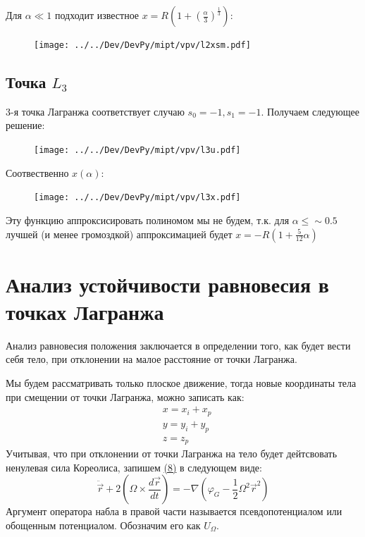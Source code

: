 \documentclass[a4paper]{article} %
\begin{document}
Для $\alpha \ll 1$ подходит известное $x = R\left(1 + (\frac{\alpha}{3})^{\frac{1}{3}}\right)$:
\begin{figure}[H]
\texttt{[image: ../../Dev/DevPy/mipt/vpv/l2xsm.pdf]} 
\end{figure}
\pagebreak

\subsection{Точка $L_3$}
3-я точка Лагранжа соответствует случаю $s_0 = -1, s_1 = -1$. Получаем следующее решение:
\begin{figure}[H]
\texttt{[image: ../../Dev/DevPy/mipt/vpv/l3u.pdf]}
\end{figure}

Соотвественно $x(\alpha)$:
\begin{figure}[H]
\texttt{[image: ../../Dev/DevPy/mipt/vpv/l3x.pdf]} 
\end{figure}
Эту функцию аппроксисировать полиномом мы не будем, т.к. для $\alpha \le \sim0.5$ лучшей (и менее громоздкой) аппроксимацией будет $x = -R\left(1 + \frac{5}{12}\alpha\right)$

\section{Анализ устойчивости равновесия в точках Лагранжа}

Анализ равновесия положения заключается в определении того, как будет вести себя тело, при отклонении на малое расстояние от точки Лагранжа.

Мы будем рассматривать только плоское движение, тогда новые координаты тела при смещении от точки Лагранжа, можно записать как:
\begin{equation}
\begin{split}
&x = x_i + x_p \\
&y = y_i + y_p \\
&z = z_p
\end{split}
\end{equation}
Учитывая, что при отклонении от точки Лагранжа на тело будет дейтсвовать ненулевая сила Кореолиса, запишем \hyperref[8]{(8)} в следующем виде:
\begin{equation}
\ddot{\vec{r}} + 2(\Omega \times \frac{d\vec{r}}{dt}) = -\nabla(\varphi_G - \frac{1}{2}\Omega^2\vec{r}^2)
\end{equation}
Аргумент оператора набла в правой части называется псевдопотенциалом или обощенным потенциалом. Обозначим его как $U_\Omega$.
\end{document}
